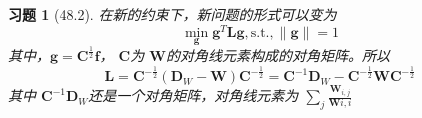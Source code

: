 \documentclass[a4paper, UTF8]{ctexart}
\newtheorem*{exercise}{\textbf{习题}}
\begin{document}
  \begin{exercise}[48.2]
    在新的约束下，新问题的形式可以变为
    \begin{equation}
      \min_\mathbf{g} \mathbf{g}^T \mathbf{L} \mathbf{g}, \mathrm{s.t.}, \lVert \mathbf{g} \rVert = 1
    \end{equation}
    其中，$\mathbf{g} = \mathbf{C}^{\frac{1}{2}} \mathbf{f}$， $\mathbf{C}$为 $\mathbf{W}$的对角线元素构成的对角矩阵。所以
    \begin{equation}
      \mathbf{L} = \mathbf{C}^{-\frac{1}{2}}\left( \mathbf{D}_W - \mathbf{W} \right) \mathbf{C}^{-\frac{1}{2}} = \mathbf{C}^{-1}\mathbf{D}_W - \mathbf{C}^{-\frac{1}{2}} \mathbf{W} \mathbf{C}^{-\frac{1}{2}}
    \end{equation}
    其中 $\mathbf{C}^{-1}\mathbf{D}_{W}$还是一个对角矩阵，对角线元素为 $\sum_j \frac{\mathbf{W}_{i,j}}{\mathbf{W}{i,i}} $
  \end{exercise}
\end{document}
